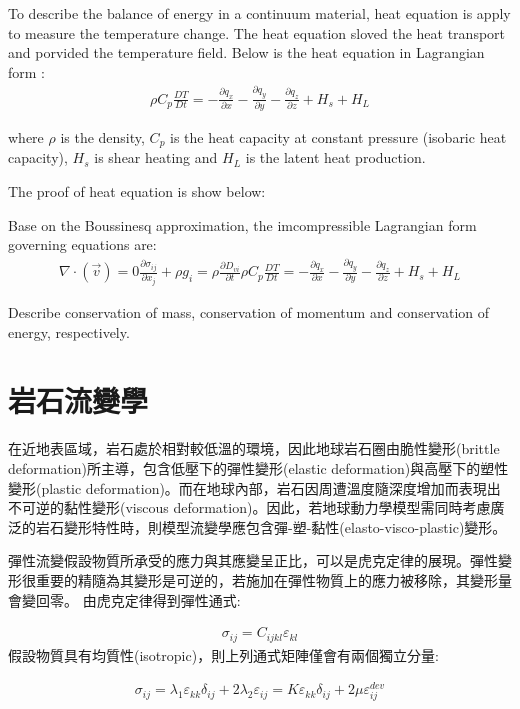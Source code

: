 To describe the balance of energy in a continuum material, heat equation is apply to measure the temperature change. The heat equation sloved the heat transport and porvided the temperature field. Below is the heat equation in Lagrangian form :
\begin{align}
\rho C_p \frac{DT}{Dt} = -\frac{\partial q_x}{\partial x}-\frac{\partial q_y}{\partial y}-\frac{\partial q_z}{\partial z}+H_s+H_L
\end{align}

where $\rho$ is the density, $C_p$ is the heat capacity at constant pressure (isobaric heat capacity), $H_s$ is shear heating and $H_L$ is the latent heat production.

The proof of heat equation is show below:

Base on the Boussinesq approximation, the imcompressible Lagrangian form governing equations are:
\begin{align}
\nabla \cdot (\vec v) = 0 
\frac{\partial \sigma_{ij}}{\partial x_j}+\rho g_i = \rho \frac{\partial D_{vi}}{\partial t}
\rho C_p \frac{DT}{Dt} = -\frac{\partial q_x}{\partial x}-\frac{\partial q_y}{\partial y}-\frac{\partial q_z}{\partial z}+H_s+H_L
\end{align}

Describe conservation of mass, conservation of momentum and conservation of energy, respectively.

\section{岩石流變學}

在近地表區域，岩石處於相對較低溫的環境，因此地球岩石圈由脆性變形(brittle deformation)所主導，包含低壓下的彈性變形(elastic deformation)與高壓下的塑性變形(plastic deformation)。而在地球內部，岩石因周遭溫度隨深度增加而表現出不可逆的黏性變形(viscous deformation)。因此，若地球動力學模型需同時考慮廣泛的岩石變形特性時，則模型流變學應包含彈-塑-黏性(elasto-visco-plastic)變形。

彈性流變假設物質所承受的應力與其應變呈正比，可以是虎克定律的展現。彈性變形很重要的精隨為其變形是可逆的，若施加在彈性物質上的應力被移除，其變形量會變回零。
由虎克定律得到彈性通式:

\begin{align}
\sigma_{ij}=C_{ijkl} 𝜀_{kl}
\end{align}
假設物質具有均質性(isotropic)，則上列通式矩陣僅會有兩個獨立分量:

\begin{align}
    σ_{ij}=λ_1 ε_{kk} δ_{ij}+2 λ_2 ε_{ij}=Kε_{kk} δ_{ij}+2 \mu ε_{ij}^{dev} \label{eqn:elastic tensor}
\end{align}

